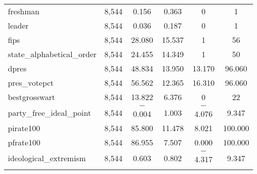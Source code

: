 \documentclass[12pt]{article}
\begin{document}
\begin{table}[H]
\begin{tabular}{@{\extracolsep{5pt}}lccccc}
		freshman & 8,544 & 0.156 & 0.363 & 0 & 1 \\ 
		leader & 8,544 & 0.036 & 0.187 & 0 & 1 \\ 
		fips & 8,544 & 28.080 & 15.537 & 1 & 56 \\ 
		state\_alphabetical\_order & 8,544 & 24.455 & 14.349 & 1 & 50 \\ 
		dpres & 8,544 & 48.834 & 13.950 & 13.170 & 96.060 \\ 
		pres\_votepct & 8,544 & 56.562 & 12.365 & 16.310 & 96.060 \\ 
		bestgrosswart & 8,544 & 13.822 & 6.376 & 0 & 22 \\ 
		party\_free\_ideal\_point & 8,544 & $-$0.004 & 1.003 & $-$4.076 & 9.347 \\ 
		pirate100 & 8,544 & 85.800 & 11.478 & 8.021 & 100.000 \\ 
		pfrate100 & 8,544 & 86.955 & 7.507 & 0.000 & 100.000 \\ 
		ideological\_extremism & 8,544 & 0.603 & 0.802 & $-$4.317 & 9.347 \\ 
		\hline \\[-1.8ex] 
	\end{tabular} 
\end{table} 
\end{document}
